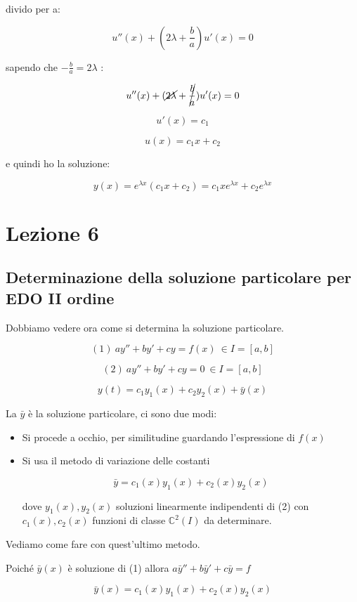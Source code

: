 \documentclass[11pt]{article}
\begin{document}
divido per a:

\[
 u''(x) + (2 \lambda + \frac{b}{a})u'(x) = 0
\]

sapendo che $-\frac{b}{a} = 2 \lambda$ :

\[
 u''(x) + (\cancel{2 \lambda} + \cancel{\frac{b}{a}})u'(x) = 0
\]


\[
    u'(x) = c_1
\]

\[
    u(x) = c_1 x +c_2
\]

e quindi ho la soluzione:

\[
    y(x) = e ^{\lambda x}(c_1x+c_2) = c_1x e^{\lambda x}+ c_2 e ^{\lambda x}
\]

\newpage

\section{Lezione 6}

\subsection{Determinazione della soluzione particolare per EDO II ordine}


Dobbiamo vedere ora come si determina la soluzione particolare.

\[
    (1)\ ay''+by'+cy = f(x)\ \in I=[a,b]
\]

\[
    (2)\ ay''+by'+cy = 0\ \in I=[a,b]
\]

\[
    y(t) = c_1 y_1(x) + c_2 y_2(x) + \bar{y} (x)
\]

La $\bar{y}$ è la soluzione particolare, ci sono due modi:

\begin{itemize}
    \item Si procede a occhio, per similitudine guardando l'espressione di $f(x)$
    \item Si usa il metodo di variazione delle costanti

        \[
            \bar{y} = c_1(x) y_1(x) + c_2(x) y_2(x)
        \]

        dove ${y_1(x),y_2(x)}$ soluzioni linearmente indipendenti di (2) con $c_1(x),c_2(x)$ funzioni di classe $\mathbb{C}^{2}(I)$ da determinare.
\end{itemize}

Vediamo come fare con quest'ultimo metodo.

Poiché $\bar{y} (x)$ è soluzione di (1) allora  $a\bar{y} ''+b \bar{y}'+c\bar{y}=f$

\[
    \bar{y} (x) = c_1(x) y_1(x) + c_2(x) y_2(x)
\]
\end{document}
